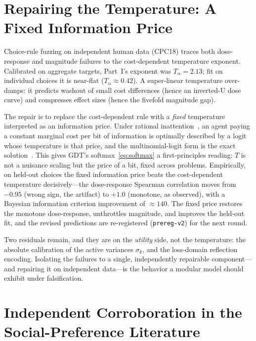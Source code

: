 \documentclass[journal]{IEEEtran}
\begin{document}
\section{Repairing the Temperature: A Fixed Information Price}
\label{sec:temperature}

Choice-rule fuzzing on independent human data (CPC18) traces both dose-response and magnitude failures to the cost-dependent temperature exponent.
Calibrated on aggregate targets, Part~I's exponent was $T_\alpha=2.13$; fit on individual choices it is near-flat ($T_\alpha\approx0.42$).
A super-linear temperature over-damps: it predicts washout of small cost differences (hence an inverted-U dose curve) and compresses effect sizes (hence the fivefold magnitude gap).

The repair is to replace the cost-dependent rule with a \emph{fixed} temperature interpreted as an information price.
Under rational inattention~\cite{sims2003}, an agent paying a constant marginal cost per bit of information is optimally described by a logit whose temperature is that price, and the multinomial-logit form is the exact solution~\cite{matejka2015}.
This gives GDT's softmax~\eqref{eq:softmax} a first-principles reading: $T$ is not a nuisance scaling but the price of a bit, fixed across problems.
Empirically, on held-out choices the fixed information price beats the cost-dependent temperature decisively---the dose-response Spearman correlation moves from $-0.95$ (wrong sign, the artifact) to $+1.0$ (monotone, as observed), with a Bayesian information criterion improvement of $\approx140$.
The fixed price restores the monotone dose-response, unthrottles magnitude, and improves the held-out fit, and the revised predictions are re-registered (\texttt{prereg-v2}) for the next round.

Two residuals remain, and they are on the \emph{utility} side, not the temperature: the absolute calibration of the active variances $\sigma_k$, and the loss-domain reflection encoding.
Isolating the failures to a single, independently repairable component---and repairing it on independent data---is the behavior a modular model should exhibit under falsification.

\section{Independent Corroboration in the Social-Preference Literature}
\label{sec:corroboration}
\end{document}
